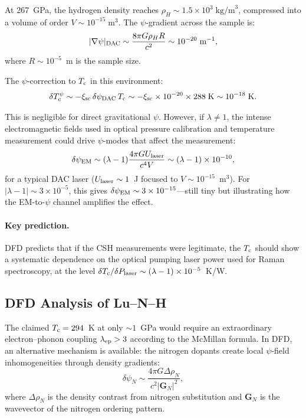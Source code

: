 \documentclass[aps,prb,twocolumn,superscriptaddress,floatfix,nofootinbib,longbibliography]{revtex4-2}
\newcommand{\Tc}{T_{\rm c}}
\begin{document}
At 267~GPa, the hydrogen density reaches
$\rho_H \sim 1.5 \times 10^3\;\text{kg/m}^3$, compressed into a volume
of order $V \sim 10^{-15}\;\text{m}^3$.  The $\psi$-gradient across the
sample is:
\begin{equation}
|\nabla\psi|_{\rm DAC} \sim \frac{8\pi G\rho_H R}{c^2}
\sim 10^{-20}\;\text{m}^{-1},
\label{eq:psi-grad-dac}
\end{equation}
where $R \sim 10^{-5}$~m is the sample size.

The $\psi$-correction to $\Tc$ in this environment:
\begin{equation}
\delta\Tc^{\psi} \sim -\xi_{\rm sc}\,\delta\psi_{\rm DAC}\,\Tc
\sim -\xi_{\rm sc} \times 10^{-20} \times 288\;\text{K}
\sim 10^{-18}\;\text{K}.
\label{eq:csh-correction}
\end{equation}

This is negligible for direct gravitational $\psi$.  However, if
$\lambda \neq 1$, the intense electromagnetic fields used in optical
pressure calibration and temperature measurement could drive $\psi$-modes
that affect the measurement:
\begin{equation}
\delta\psi_{\rm EM} \sim (\lambda - 1)\frac{4\pi G U_{\rm laser}}{c^4 V}
\sim (\lambda - 1) \times 10^{-10},
\label{eq:psi-em-dac}
\end{equation}
for a typical DAC laser ($U_{\rm laser} \sim 1$~J focused to
$V \sim 10^{-15}$~m$^3$).  For
$|\lambda - 1| \sim 3 \times 10^{-5}$, this gives
$\delta\psi_{\rm EM} \sim 3 \times 10^{-15}$---still tiny but
illustrating how the EM-to-$\psi$ channel amplifies the effect.

\paragraph{Key prediction.}  DFD predicts that if the CSH measurements
were legitimate, the $\Tc$ should show a systematic dependence on the
optical pumping laser power used for Raman spectroscopy, at the level
$\delta\Tc/\delta P_{\rm laser} \sim (\lambda - 1) \times 10^{-5}$~K/W.

\subsection{DFD Analysis of Lu--N--H}

The claimed $\Tc = 294$~K at only $\sim 1$~GPa would require an
extraordinary electron--phonon coupling $\lambda_{\rm ep} > 3$
according to the McMillan formula.  In DFD, an alternative mechanism
is available: the nitrogen dopants create local $\psi$-field
inhomogeneities through density gradients:
\begin{equation}
\delta\psi_N \sim \frac{4\pi G \Delta\rho_N}{c^2 |\mathbf{G}_N|^2},
\label{eq:psi-N}
\end{equation}
where $\Delta\rho_N$ is the density contrast from nitrogen substitution
and $\mathbf{G}_N$ is the wavevector of the nitrogen ordering pattern.
\end{document}
